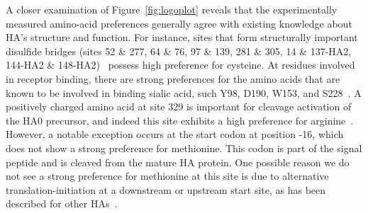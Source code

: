 \documentclass[9pt,twocolumn,twoside]{pnas-new}
\begin{document}
A closer examination of Figure~\ref{fig:logoplot} reveals that the experimentally measured amino-acid preferences generally agree with existing knowledge about HA's structure and function.
For instance, sites that form structurally important disulfide bridges (sites 52 \& 277, 64 \& 76, 97 \& 139, 281 \& 305, 14 \& 137-HA2, 144-HA2 \& 148-HA2)~\cite{waterfield1981disulphide} possess high preference for cysteine.
At residues involved in receptor binding, there are strong preferences for the amino acids that are known to be involved in binding sialic acid, such Y98, D190, W153, and S228~\cite{weis1988structure,martin1998studies,nobusawa2000change,yang2015structure}.
A positively charged amino acid at site 329 is important for cleavage activation of the HA0 precursor, and indeed this site exhibits a high preference for arginine~\cite{kido1992isolation, stech2005new}.
However, a notable exception occurs at the start codon at position -16, which does not show a strong preference for methionine. 
This codon is part of the signal peptide and is cleaved from the mature HA protein.
One possible reason we do not see a strong preference for methionine at this site is due to alternative translation-initiation at a downstream or upstream start site, as has been described for other HAs~\cite{girard2011upstream}.
\end{document}
